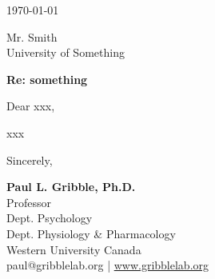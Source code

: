 \documentclass[11pt]{article}
\begin{document}
\thispagestyle{fancy}

\today
\vspace{2.0ex}

Mr. Smith\\  				%
University of Something

\vspace{2.5ex}

\textbf{Re: something}		%
\vspace{1.5ex}

Dear xxx,					%

xxx							%

\vspace{2.0ex}
Sincerely,
\vspace{25mm}

\textbf{Paul L. Gribble, Ph.D.}\\
Professor\\
Dept. Psychology\\
Dept. Physiology \& Pharmacology\\
Western University Canada\\
{\color{uwopurple}paul@gribblelab.org | \href{http://www.gribblelab.org}{www.gribblelab.org}}
\end{document}
